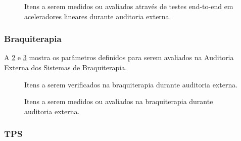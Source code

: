 \documentclass[11pt,a4paper]{article}
\begin{document}
	\begin{figure}[h]
		\centering
		\caption{Itens a serem medidos ou avaliados através de testes end-to-end em aceleradores lineares durante auditoria externa.}
		\label{fig:aeAle2e}
	\end{figure}

\subsubsection*{Braquiterapia}

	A \ref{fig:aeBqVeri} e \ref{fig:aeBqe2e} mostra os parâmetros definidos para serem avaliados na Auditoria Externa dos Sistemas de Braquiterapia.

	\begin{figure}[h]
		\centering
		\caption{Itens a serem verificados na braquiterapia durante auditoria externa.}
		\label{fig:aeBqVeri}
	\end{figure}

	\begin{figure}[h]
		\centering
		\caption{Itens a serem medidos ou avaliados na braquiterapia durante auditoria externa.}
		\label{fig:aeBqe2e}
	\end{figure}

\subsubsection*{TPS}
\end{document}
